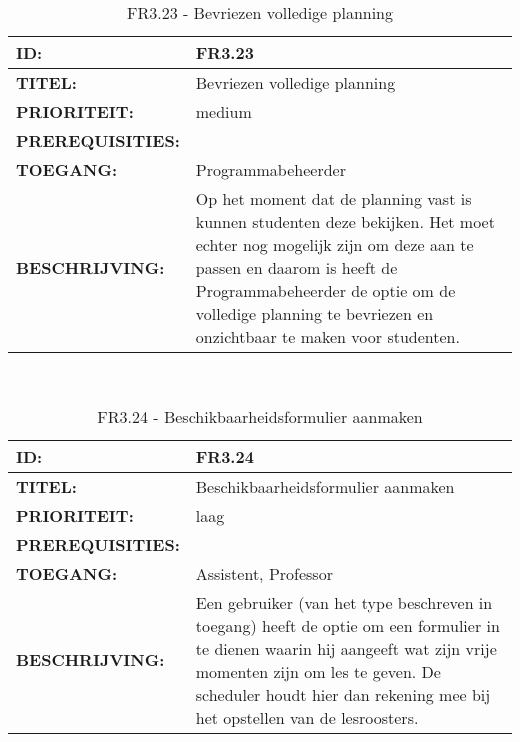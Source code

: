 \noindent\begin{table}[H]
            \begin{tabular}{l | p{10cm}}
                \textbf{ID:} & FR3.23 \\ \hline
                \textbf{TITEL:} & Bevriezen volledige planning\\ \hline
                \textbf{PRIORITEIT:} &  medium \\ \hline
                \textbf{PREREQUISITIES:} & \\ \hline
                \textbf{TOEGANG:} & Programmabeheerder \\ \hline
                \textbf{BESCHRIJVING:} & Op het moment dat de planning vast is kunnen studenten deze bekijken. Het moet echter nog mogelijk zijn om deze aan te passen en daarom is heeft de Programmabeheerder de optie om de volledige planning te bevriezen en onzichtbaar te maken voor studenten.\\ 
            \end{tabular}\\
            \caption{FR3.23 - Bevriezen volledige planning}
            \label{tab:FR3.23 - Bevriezen volledige planning}
        \end{table}   

\noindent\begin{table}[H]
            \begin{tabular}{l | p{10cm}}
                \textbf{ID:} & FR3.24 \\ \hline
                \textbf{TITEL:} & Beschikbaarheidsformulier aanmaken\\ \hline
                \textbf{PRIORITEIT:} &  laag \\ \hline
                \textbf{PREREQUISITIES:} & \\ \hline
                \textbf{TOEGANG:} & Assistent, Professor \\ \hline
                \textbf{BESCHRIJVING:} & Een gebruiker (van het type beschreven in toegang) heeft de optie om een formulier in te dienen waarin hij aangeeft wat zijn vrije momenten zijn om les te geven. De scheduler houdt hier dan rekening mee bij het opstellen van de lesroosters.\\ 
            \end{tabular}\\
            \caption{FR3.24 - Beschikbaarheidsformulier aanmaken}
            \label{tab:FR24 - Beschikbaarheidsformulier aanmaken}
        \end{table}
